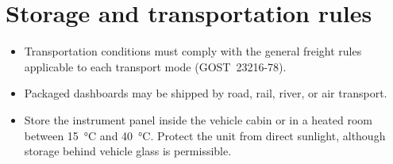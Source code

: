 \chapter{Storage and transportation rules}\label{ch:storage}

\begin{itemize}
    \item Transportation conditions must comply with the general freight rules applicable to each transport mode (GOST~23216-78).
    \item Packaged dashboards may be shipped by road, rail, river, or air transport.
    \item Store the instrument panel inside the vehicle cabin or in a heated room between \SI{15}{\celsius} and \SI{40}{\celsius}. Protect the unit from direct sunlight, although storage behind vehicle glass is permissible.
\end{itemize}
